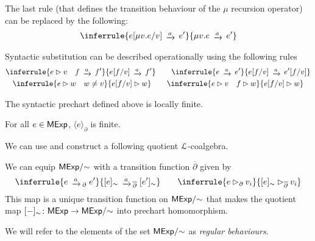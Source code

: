 \begin{remark}
	The last rule (that defines the transition behaviour of the $\mu$ recursion operator) can be replaced by the following:
	\begin{gather*}
		\inferrule{e[\mu v. e / v] \tr{a} e'}{\mu v. e \tr{a} e'}
	\end{gather*}
\end{remark}

\begin{remark}\label{rem:semantic-substitution}
	Syntactic substitution can be described operationally using the following rules
	\begin{gather*}
		\inferrule{e \rhd v\quad f\tr{a} f'}{e[f / v] \tr{a} f'}\qquad \inferrule{e \tr{a} e'}{e[f / v] \tr{a} e'[f/v]}\\ \inferrule{e \rhd w \quad w \neq v }{e[f/v] \rhd w} \qquad \inferrule{e \rhd v \quad f \rhd w}{e[f/v] \rhd w}
	\end{gather*}
\end{remark}
The syntactic prechart defined above is locally finite.
\begin{lemma}
	For all $e \in \mathsf{MExp}$, $\langle e \rangle_\partial$ is finite.
\end{lemma}
We can use  and construct a following quotient $\mathcal{L}$-coalgebra.
\begin{lemma}\label{lem:quotient_chart}	
	We can equip ${\mathsf{MExp}}/{\sim}$ with a transition function $\overline\partial$ given by
	$$
	\inferrule{e \tr{a}_\partial e'}{[e]_\sim \tr{a}_{\overline\partial} [e']_\sim} \qquad \inferrule{e \rhd_{\partial} v_i}{[e]_\sim \rhd_{\overline{\partial}} v_i}
	$$
	This map is a unique transition function on ${\mathsf{MExp}}/{\sim}$ that makes the quotient map $[-]_{\sim} \colon \mathsf{MExp} \to {\mathsf{MExp}}/{\sim}$ into prechart homomorphism.
\end{lemma}
We will refer to the elements of the set $\mathsf{MExp}/{\sim}$ as \emph{regular behaviours}.

